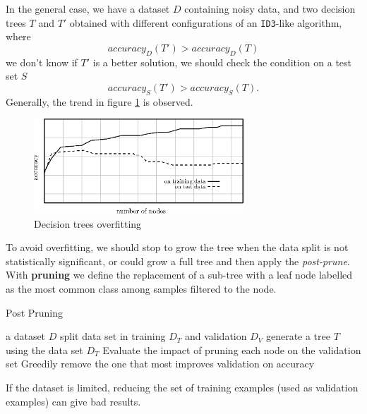 \documentclass[10pt, letterpaper]{report}
\begin{document}
In the general case, we have a dataset $D$ containing noisy data, and two decision trees $T$ and $T'$ obtained with different configurations of an \texttt{ID3}-like algorithm, where\begin{equation}
    accuracy_D(T')>accuracy_D(T)
\end{equation}
we don't know if $T'$ is a better solution, we should check the condition on a test set $S$\begin{equation}
    accuracy_S(T')>accuracy_S(T).
\end{equation}
Generally, the trend in figure \ref{img:trees_overfitting} is observed.\bigskip

\begin{figure}[h!]
    \centering
    \includegraphics[width=0.7\textwidth]{images/trees_overfitting.eps}
    \caption{Decision trees overfitting}
    \label{img:trees_overfitting}
\end{figure}


To avoid overfitting, we should stop to grow the tree when the data split is not statistically significant, or could grow a full tree and then apply the \textit{post-prune}. With \textbf{pruning} we define the replacement of a sub-tree with a leaf node labelled as the most common class among samples filtered to the node.\bigskip

\begin{algorithm}
    \caption{Post Pruning}\label{alg:pruning}
    \begin{algorithmic}
    \Require a dataset $D$
    \State split data set in training $D_T$ and validation $D_V$
    \State generate a tree $T$ using the data set $D_T$
    \State  Evaluate the impact of pruning each node on the validation set 
    \State Greedily remove the one that most improves validation on accuracy
    \EndWhile
    \end{algorithmic}
\end{algorithm}

If the dataset is limited, reducing the set of training examples (used
as validation examples) can give bad results.\bigskip
\end{document}
